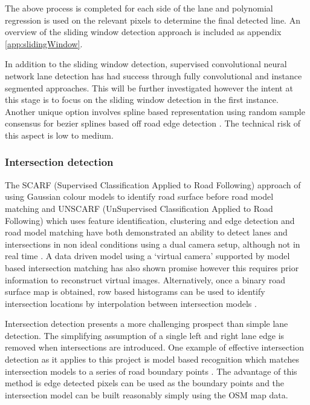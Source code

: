 \documentclass[]{aiaa-tc}%
\begin{document}
The above process is completed for each side of the lane and polynomial regression is used on the relevant pixels to determine the final detected line. An overview of the sliding window detection approach is included as appendix \ref{app:slidingWindow}.

In addition to the sliding window detection, supervised convolutional neural network lane detection has had success through fully convolutional \citep{cnnLanes1} and instance segmented \citep{cnnLanes2} approaches. This will be further investigated however the intent at this stage is to focus on the sliding window detection in the first instance. Another unique option involves spline based representation using random sample consensus for bezier splines based off road edge detection \citep{ransicBezierFit}. The technical risk of this aspect is low to medium.



\subsubsection{Intersection detection}

The SCARF (Supervised Classification Applied to Road Following) approach of using Gaussian colour models to identify road surface before road model matching \citep{scarf} and UNSCARF (UnSupervised Classification Applied to Road Following) which uses feature identification, clustering and edge detection and road model matching \citep{unscarf} have both demonstrated an ability to detect lanes and intersections in non ideal conditions using a dual camera setup, although not in real time \citep{scarfAndUnscarfPresented}. A data driven model using a `virtual camera' supported by model based intersection matching has also shown promise \citep{alvinnVC} however this requires prior information to reconstruct virtual images. Alternatively, once a binary road surface map is obtained, row based histograms can be used to identify intersection locations by interpolation between intersection models \citep{intersectionDetectionSingleCamera}.

Intersection detection presents a more challenging prospect than simple lane detection. The simplifying assumption of a single left and right lane edge is removed when intersections are introduced. One example of effective intersection detection as it applies to this project is model based recognition which matches intersection models to a series of road boundary points \citep{modelBasedIntersection}. The advantage of this method is edge detected pixels can be used as the boundary points and the intersection model can be built reasonably simply using the OSM map data.
\end{document}
